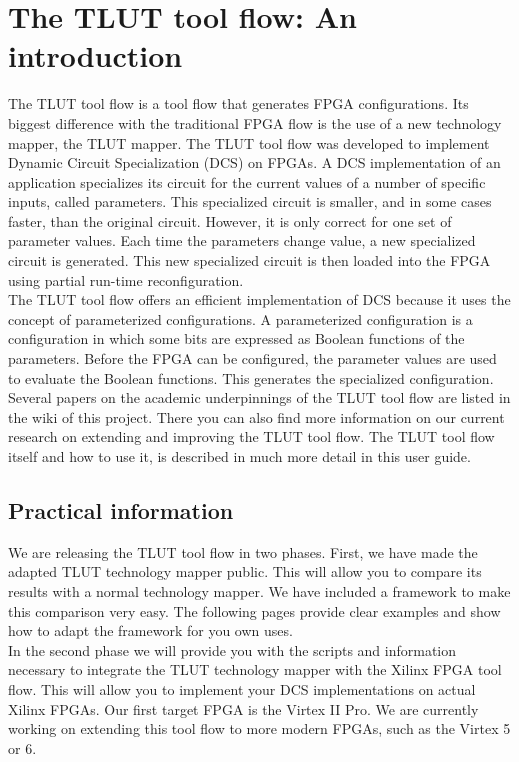 \documentclass[a4paper,oneside]{memoir}
\begin{document}
\let\clearforchapter\par %
\chapter{The TLUT tool flow: An introduction}

The TLUT tool flow is a tool flow that generates FPGA configurations. Its biggest difference with the traditional FPGA flow is the use of a new technology mapper, the TLUT mapper. The TLUT tool flow was developed to implement Dynamic Circuit Specialization (DCS) on FPGAs. A DCS implementation of an application specializes its circuit for the current values of a number of specific inputs, called parameters. This specialized circuit is smaller, and in some cases faster, than the original circuit. However, it is only correct for one set of parameter values. Each time the parameters change value, a new specialized circuit is generated. This new specialized circuit is then loaded into the FPGA using partial run-time reconfiguration.\\

The TLUT tool flow offers an efficient implementation of DCS because it uses the concept of parameterized configurations. A parameterized configuration is a configuration in which some bits are expressed as Boolean functions of the parameters. Before the FPGA can be configured, the parameter values are used to evaluate the Boolean functions. This generates the specialized configuration. Several papers on the academic underpinnings of the TLUT tool flow are listed in the wiki of this project. There you can also find more information on our current research on extending and improving the TLUT tool flow. The TLUT tool flow itself and how to use it, is described in much more detail in this user guide.

\section{Practical information}

We are releasing the TLUT tool flow in two phases. First, we have made the adapted TLUT technology mapper public. This will allow you to compare its results with a normal technology mapper. We have included a framework to make this comparison very easy. The following pages provide clear examples and show how to adapt the framework for you own uses.\\

In the second phase we will provide you with the scripts and information necessary to integrate the TLUT technology mapper with the Xilinx FPGA tool flow. This will allow you to implement your DCS implementations on actual Xilinx FPGAs. Our first target FPGA is the Virtex II Pro. We are currently working on extending this tool flow to more modern FPGAs, such as the Virtex 5 or 6.
\end{document}
